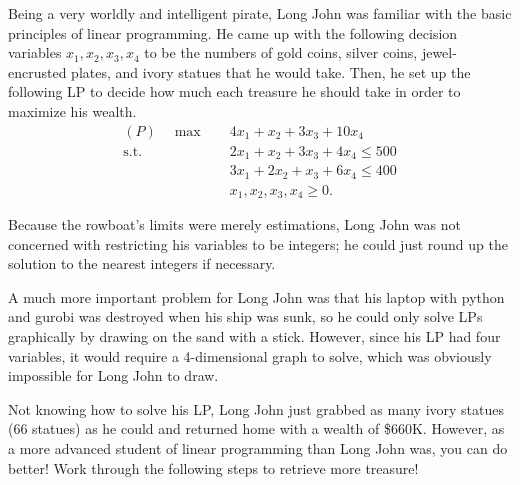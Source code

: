 \documentclass[11pt]{article}
\begin{document}
\begin{enumerate}
Being a very worldly and intelligent pirate, Long John was familiar with the basic principles of linear programming. He came up with the following decision variables $x_1, x_2, x_3, x_4$ to be the numbers of gold coins, silver coins, jewel-encrusted plates, and ivory statues that he would take. Then, he set up the following LP to decide how much each treasure he should take in order to maximize his wealth. 
\begin{align*}
(P)\quad\max \quad & 4x_1 + x_2 + 3x_3 + 10x_4 \\
\text{s.t.}\quad & 2x_1 + x_2 + 3x_3 + 4x_4 \leq 500\\
			    & 3x_1 + 2x_2 + x_3 + 6x_4 \leq 400\\
                       & x_1, x_2, x_3, x_4 \geq 0.
\end{align*} 

Because the rowboat's limits were merely estimations, Long John was not concerned with restricting his variables to be integers; he could just round up the solution to the nearest integers if necessary. 

A much more important problem for Long John was that his laptop with python and gurobi was destroyed when his ship was sunk, so he could only solve LPs graphically by drawing on the sand with a stick. However, since his LP had four variables, it would require a 4-dimensional graph to solve, which was obviously impossible for Long John to draw.

Not knowing how to solve his LP, Long John just grabbed as many ivory statues (66 statues) as he could and returned home with a wealth of \$660K. However, as a more advanced student of linear programming than Long John was, you can do better! Work through the following steps to retrieve more treasure!


\end{enumerate}
\end{document}
